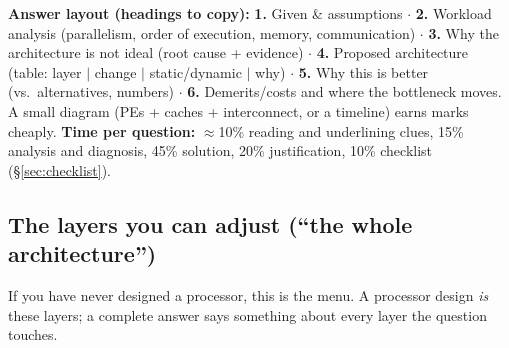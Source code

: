 \textbf{Answer layout (headings to copy):} \textbf{1.} Given \& assumptions $\cdot$ \textbf{2.} Workload analysis (parallelism, order of execution, memory, communication) $\cdot$ \textbf{3.} Why the architecture is not ideal (root cause + evidence) $\cdot$ \textbf{4.} Proposed architecture (table: layer $|$ change $|$ static/dynamic $|$ why) $\cdot$ \textbf{5.} Why this is better (vs.\ alternatives, numbers) $\cdot$ \textbf{6.} Demerits/costs and where the bottleneck moves. A small diagram (PEs + caches + interconnect, or a timeline) earns marks cheaply.
\textbf{Time per question:} $\approx$10\% reading and underlining clues, 15\% analysis and diagnosis, 45\% solution, 20\% justification, 10\% checklist (\S\ref{sec:checklist}).

\subsection{The layers you can adjust (``the whole architecture'')}\label{sec:layers}
If you have never designed a processor, this is the menu. A processor design \emph{is} these layers; a complete answer says something about every layer the question touches.
\small
